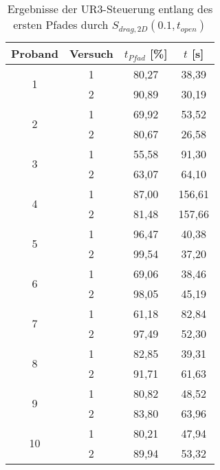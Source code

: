\begin{table}[htb]
	\caption{Ergebnisse der UR3-Steuerung entlang des ersten Pfades durch $S_{drag,2D}(0.1,t_{open})$}
	\label{table pfad rob1}
	\begin{center}
		\begin{tabular}{ |c|c|c|c| }
			\hline
			Proband & Versuch & $t_{Pfad}$ [\%] & $t$ [s] \\ 
			\hline
			\multirow{2}{*}{1} 
			& 1 & 80,27 & 38,39 \\
			& 2 & 90,89 & 30,19 \\
			\hline
			
			\multirow{2}{*}{2} 
			& 1 & 69,92 & 53,52 \\
			& 2 & 80,67 & 26,58 \\
			\hline	
			
			\multirow{2}{*}{3} 
			& 1 & 55,58 & 91,30 \\
			& 2 & 63,07 & 64,10 \\
			\hline
			
			\multirow{2}{*}{4} 
			& 1 & 87,00 & 156,61 \\
			& 2 & 81,48 & 157,66 \\
			\hline
			
			\multirow{2}{*}{5} 
			& 1 & 96,47 & 40,38 \\
			& 2 & 99,54 & 37,20 \\
			\hline
			
			\multirow{2}{*}{6} 
			& 1 & 69,06 & 38,46 \\
			& 2 & 98,05 & 45,19 \\
			\hline
			
			\multirow{2}{*}{7} 
			& 1 & 61,18 & 82,84 \\
			& 2 & 97,49 & 52,30 \\
			\hline
			
			\multirow{2}{*}{8} 
			& 1 & 82,85 & 39,31 \\
			& 2 & 91,71 & 61,63 \\
			\hline
			
			\multirow{2}{*}{9} 
			& 1 & 80,82 & 48,52 \\
			& 2 & 83,80 & 63,96 \\
			\hline
			
			\multirow{2}{*}{10} 
			& 1 & 80,21 & 47,94 \\
			& 2 & 89,94 & 53,32 \\
			\hline
		\end{tabular}
	\end{center}
\end{table}

